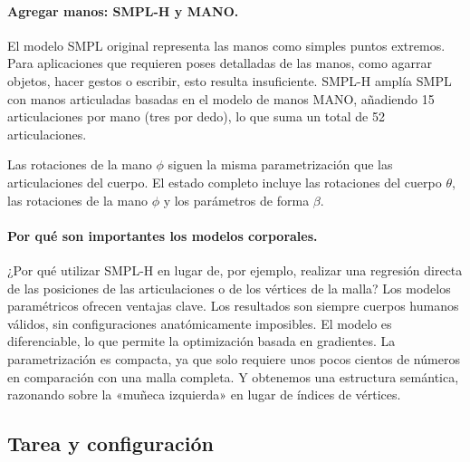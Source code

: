 \documentclass[../../book-main_es.tex]{subfiles}
\begin{document}
\paragraph{Agregar manos: SMPL-H y MANO.}
El modelo SMPL original representa las manos como simples puntos extremos. Para
aplicaciones que requieren poses detalladas de las manos, como agarrar objetos, hacer gestos
o escribir, esto resulta insuficiente. SMPL-H \citep{romero2017embodied}
amplía SMPL con manos articuladas basadas en el modelo de manos MANO,
añadiendo 15 articulaciones por mano (tres por dedo), lo que suma un total de 52 articulaciones.

Las rotaciones de la mano $\phi$ siguen la misma parametrización que las articulaciones
del cuerpo. El estado completo incluye las rotaciones del cuerpo $\theta$, las rotaciones
de la mano $\phi$ y los parámetros de forma $\beta$.

\paragraph{Por qué son importantes los modelos corporales.}
¿Por qué utilizar SMPL-H en lugar de, por ejemplo, realizar una regresión directa de las posiciones de las articulaciones
o de los vértices de la malla? Los modelos paramétricos ofrecen ventajas clave. Los resultados son
siempre cuerpos humanos válidos, sin configuraciones anatómicamente imposibles.
El modelo es diferenciable, lo que permite la optimización basada en gradientes.
La parametrización es compacta, ya que solo requiere unos pocos
cientos de números en comparación con una malla completa. Y obtenemos una estructura semántica,
razonando sobre la «muñeca izquierda» en lugar de índices de vértices.

\subsection{Tarea y configuración}
\label{sub:egoallo_objective}
\end{document}
